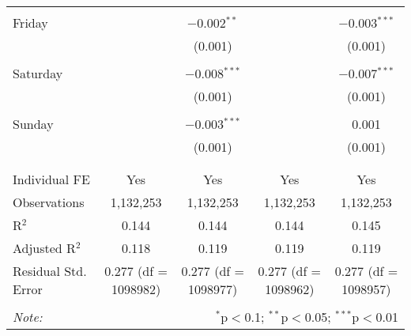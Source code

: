 \documentclass[
]{article}
\begin{document}
\begin{table}[!htbp]
{\begin{tabular}{@{\extracolsep{5pt}}lcccc}
  & & & & \\ 
 Friday &  & $-$0.002$^{**}$ &  & $-$0.003$^{***}$ \\ 
  &  & (0.001) &  & (0.001) \\ 
  & & & & \\ 
 Saturday &  & $-$0.008$^{***}$ &  & $-$0.007$^{***}$ \\ 
  &  & (0.001) &  & (0.001) \\ 
  & & & & \\ 
 Sunday &  & $-$0.003$^{***}$ &  & 0.001 \\ 
  &  & (0.001) &  & (0.001) \\ 
  & & & & \\ 
\hline \\[-1.8ex] 
Individual FE & Yes & Yes & Yes & Yes \\ 
Observations & 1,132,253 & 1,132,253 & 1,132,253 & 1,132,253 \\ 
R$^{2}$ & 0.144 & 0.144 & 0.144 & 0.145 \\ 
Adjusted R$^{2}$ & 0.118 & 0.119 & 0.119 & 0.119 \\ 
Residual Std. Error & 0.277 (df = 1098982) & 0.277 (df = 1098977) & 0.277 (df = 1098962) & 0.277 (df = 1098957) \\ 
\hline 
\hline \\[-1.8ex] 
\textit{Note:}  & \multicolumn{4}{r}{$^{*}$p$<$0.1; $^{**}$p$<$0.05; $^{***}$p$<$0.01} \\ 
\end{tabular}
} 
\end{table}
\end{document}
